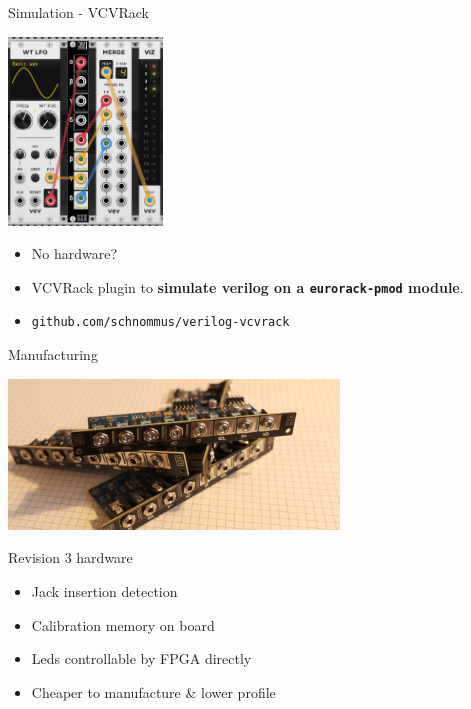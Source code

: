 \documentclass{beamer}
\begin{document}
\begin{frame}{Simulation - VCVRack}

    \begin{center}
        \includegraphics[height=5cm]{img/vcvrack.png}
    \end{center}

    \begin{itemize}
        \item No hardware?
        \item VCVRack plugin to \textbf{simulate verilog on a \texttt{eurorack-pmod} module}.
        \item \texttt{github.com/schnommus/verilog-vcvrack}
    \end{itemize}

\end{frame}

\begin{frame}{Manufacturing}

    \begin{center}
        \includegraphics[height=4cm]{img/mfg_stack.png}
    \end{center}

    \begin{block}{Revision 3 hardware}
        \begin{itemize}
            \item Jack insertion detection
            \item Calibration memory on board
            \item Leds controllable by FPGA directly
            \item Cheaper to manufacture \& lower profile
        \end{itemize}
    \end{block}

\end{frame}
\end{document}
